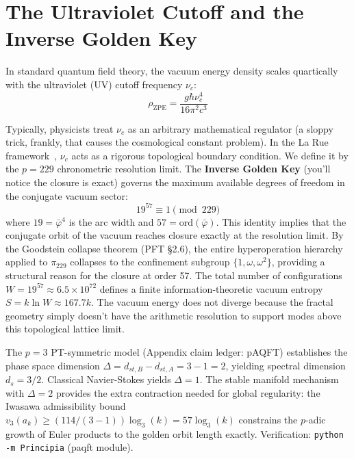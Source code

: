 \section{The Ultraviolet Cutoff and the Inverse Golden Key}\label{sec:uv}

In standard quantum field theory, the vacuum energy density scales quartically with the ultraviolet (UV) cutoff frequency $\nu_c$:
\begin{equation}\label{eq:zpe}
    \rho_{\text{ZPE}} = \frac{g \hbar \nu_c^4}{16 \pi^2 c^3}
\end{equation}

Typically, physicists treat $\nu_c$ as an arbitrary mathematical regulator (a sloppy trick, frankly, that causes the cosmological constant problem). In the La Rue framework~\cite{larue2026lc}, $\nu_c$ acts as a rigorous topological boundary condition. We define it by the $p=229$ chronometric resolution limit. The \textbf{Inverse Golden Key} (you'll notice the closure is exact) governs the maximum available degrees of freedom in the conjugate vacuum sector:
\begin{equation}\label{eq:golden_key}
    19^{57} \equiv 1 \pmod{229}
\end{equation}
where $19 = \bar{\varphi}^4$ is the arc width and $57 = \text{ord}(\bar{\varphi})$. This identity implies that the conjugate orbit of the vacuum reaches closure exactly at the resolution limit. By the Goodstein collapse theorem (PFT \S2.6), the entire hyperoperation hierarchy applied to $\pi_{229}$ collapses to the confinement subgroup $\{1, \omega, \omega^2\}$, providing a structural reason for the closure at order 57. The total number of configurations $W = 19^{57} \approx 6.5 \times 10^{72}$ defines a finite information-theoretic vacuum entropy $S = k \ln W \approx 167.7 k$. The vacuum energy does not diverge because the fractal geometry simply doesn't have the arithmetic resolution to support modes above this topological lattice limit.

\begin{remark}
The $p=3$ PT-symmetric model (Appendix claim ledger: pAQFT) establishes the phase space dimension $\Delta = d_{st,B} - d_{st,A} = 3 - 1 = 2$, yielding spectral dimension $d_s = 3/2$.  Classical Navier-Stokes yields $\Delta = 1$.  The stable manifold mechanism with $\Delta = 2$ provides the extra contraction needed for global regularity: the Iwasawa admissibility bound $v_3(a_k) \geq (114/(3-1)) \log_3(k) = 57 \log_3(k)$ constrains the $p$-adic growth of Euler products to the golden orbit length exactly.  Verification: \texttt{python -m Principia} (paqft module).
\end{remark}

